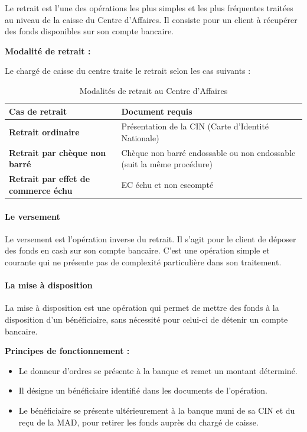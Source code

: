 Le retrait est l'une des opérations les plus simples et les plus fréquentes traitées au niveau de la caisse du Centre d'Affaires. Il consiste pour un client à récupérer des fonds disponibles sur son compte bancaire.

\medskip
\textbf{Modalité de retrait :}

Le chargé de caisse du centre traite le retrait selon les cas suivants :

\begin{table}[h!]
\centering
\begin{tabularx}{\textwidth}{>{\bfseries}X X}
\toprule
Cas de retrait & Document requis \\
\midrule
Retrait ordinaire & Présentation de la CIN (Carte d'Identité Nationale) \\
\addlinespace
Retrait par chèque non barré & Chèque non barré endossable ou non endossable (suit la même procédure) \\
\addlinespace
Retrait par effet de commerce échu & EC échu et non escompté \\
\bottomrule
\end{tabularx}
\caption{Modalités de retrait au Centre d'Affaires}
\end{table}

\paragraph{Le versement}

Le versement est l'opération inverse du retrait. Il s'agit pour le client de déposer des fonds en cash sur son compte bancaire. C'est une opération simple et courante qui ne présente pas de complexité particulière dans son traitement.

\paragraph{La mise à disposition}

La mise à disposition est une opération qui permet de mettre des fonds à la disposition d'un bénéficiaire, sans nécessité pour celui-ci de détenir un compte bancaire.

\medskip\textbf{Principes de fonctionnement :}
\begin{itemize}
  \item Le donneur d'ordres se présente à la banque et remet un montant déterminé.
  \item Il désigne un bénéficiaire identifié dans les documents de l'opération.
  \item Le bénéficiaire se présente ultérieurement à la banque muni de sa CIN et du reçu de la MAD, pour retirer les fonds auprès du chargé de caisse.
\end{itemize}

